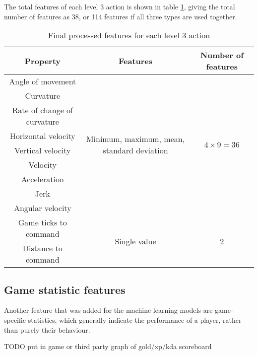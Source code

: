 \documentclass[Report.tex]{subfiles}
\begin{document}
The total features of each level 3 action is shown in table \ref{tbl-level3features}, giving the total number of features as 38, or 114 features if all three types are used together.
\begin{table}[H]
\renewcommand*{\arraystretch}{1.5}
\centering
\begin{tabular}{| c | c | c |}
\hline
\textbf{Property} & \textbf{Features} & \textbf{Number of features} \\ \hline
Angle of movement & \multirow{9}{6cm}{Minimum, maximum, mean, standard deviation} & \multirow{9}{*}{$4 \times 9  = 36$} \\ \cline{1-1}
Curvature & & \\ \cline{1-1}
Rate of change of curvature & & \\ \cline{1-1}
Horizontal velocity & & \\ \cline{1-1}
Vertical velocity & & \\ \cline{1-1}
Velocity & & \\ \cline{1-1}
Acceleration & & \\ \cline{1-1}
Jerk & & \\ \cline{1-1}
Angular velocity & & \\ \hline
Game ticks to command & \multirow{2}{*}{Single value} & \multirow{2}{*}{2} \\ \cline{1-1}
Distance to command & & \\ \hline
\end{tabular}
\caption{Final processed features for each level 3 action}
\label{tbl-level3features}
\end{table}

\subsection{Game statistic features}
Another feature that was added for the machine learning models are game-specific statistics, which generally indicate the performance of a player, rather than purely their behaviour.

TODO put in game or third party graph of gold/xp/kda scoreboard
\end{document}
